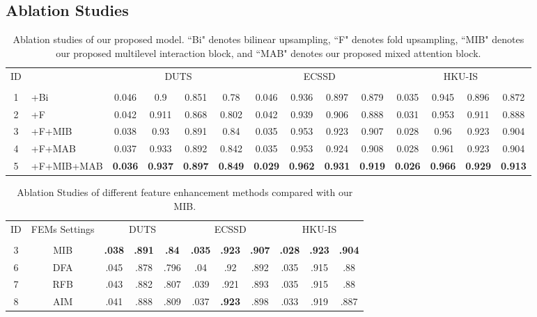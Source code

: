 \documentclass[lettersize,journal]{IEEEtran}
\begin{document}
\subsection{Ablation Studies}
\begin{table*}
	\centering
	\scriptsize
	\caption{Ablation studies of our proposed model. ``Bi" denotes bilinear upsampling, ``F" denotes fold upsampling, ``MIB" denotes our proposed multilevel interaction block, and ``MAB" denotes our proposed mixed attention block. }
	\label{tab:ablation}
	\setlength\tabcolsep{2.5mm}
	\begin{tabular}{c|l|cccc|cccc|cccc}\hline
		\multirow{2}{*}{ID} & {\multirow{2}{*}{Component Settings}} & \multicolumn{4}{c|}{DUTS} & \multicolumn{4}{c|}{ECSSD} & \multicolumn{4}{c}{HKU-IS}\\
		
		& &  &  &  &  &  &  &  &  &  &  &  &  \\
		\hline 1 & +Bi & 0.046 & 0.9 & 0.851 & 0.78 & 0.046 & 0.936 & 0.897 & 0.879 & 0.035 & 0.945 & 0.896 & 0.872\\
		2 & +F & 0.042 & 0.911 & 0.868 & 0.802 & 0.042 & 0.939 & 0.906 & 0.888 & 0.031 & 0.953 & 0.911 & 0.888\\
		3 & +F+MIB & 0.038 & 0.93 & 0.891 & 0.84 & 0.035 & 0.953 & 0.923 & 0.907 & 0.028 & 0.96 & 0.923 & 0.904\\
		4 & +F+MAB & 0.037 & 0.933 & 0.892 & 0.842 & 0.035 & 0.953 & 0.924 & 0.908 & 0.028 & 0.961 & 0.923 & 0.904\\
		5 & +F+MIB+MAB & \textbf{0.036} & \textbf{0.937} & \textbf{0.897} & \textbf{0.849} & \textbf{0.029} & \textbf{0.962} & \textbf{0.931} & \textbf{0.919} & \textbf{0.026} & \textbf{ 0.966} & \textbf{0.929} & \textbf{0.913} \\
		\hline 
	\end{tabular}
	\vspace{-3mm}
\end{table*}
\begin{table}
	\centering
	\scriptsize
	\caption{Ablation Studies of different feature enhancement methods compared with our MIB. }
	\label{tab:mib_vs_fems}
	\setlength\tabcolsep{0.5mm}
	\begin{tabular}{c|c|ccc|ccc|ccc}\hline
		\multirow{2}{*}{ID} & \multirow{2}{*}{FEMs Settings} & \multicolumn{3}{c|}{DUTS} & \multicolumn{3}{c|}{ECSSD} & \multicolumn{3}{c}{HKU-IS}\\
		&&  &  &  &  &  &  &  &  &  \\
		\hline
		3& MIB & \textbf{.038} & \textbf{.891} & \textbf{.84} & \textbf{.035} & \textbf{.923} & \textbf{.907} & \textbf{.028} & \textbf{.923} & \textbf{.904} \\
		6& DFA\cite{ICON} & .045 & .878 & .796 & .04 & .92 & .892 & .035 & .915 & .88 \\
7& RFB\cite{Liu_2018_ECCV} & .043 & {.882} & {.807} & {.039} & {.921} & {.893} & {.035} & {.915} & {.88} \\
		8& AIM\cite{MiNet} & .041 & {.888} & {.809} & {.037} & \textbf{.923} & {.898} & {.033} & {.919} & {.887} \\
		\hline
	\end{tabular}
\end{table}
\end{document}
